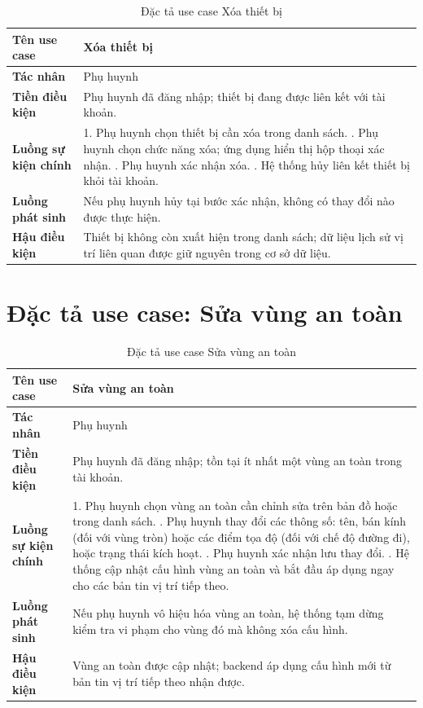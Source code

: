 \documentclass[../DoAn.tex]{subfiles}
\begin{document}
\begin{table}[H]
\centering
\caption{Đặc tả use case Xóa thiết bị}
\label{table:uc_delete_device}
\begin{tabular}{|l|p{9.5cm}|}
\hline
\textbf{Tên use case}       & Xóa thiết bị \\
\hline
\textbf{Tác nhân}           & Phụ huynh \\
\hline
\textbf{Tiền điều kiện}     & Phụ huynh đã đăng nhập; thiết bị đang được liên kết với tài khoản. \\
\hline
\textbf{Luồng sự kiện chính} &
1. Phụ huynh chọn thiết bị cần xóa trong danh sách. \newline
2. Phụ huynh chọn chức năng xóa; ứng dụng hiển thị hộp thoại xác nhận. \newline
3. Phụ huynh xác nhận xóa. \newline
4. Hệ thống hủy liên kết thiết bị khỏi tài khoản. \\
\hline
\textbf{Luồng phát sinh}    & Nếu phụ huynh hủy tại bước xác nhận, không có thay đổi nào được thực hiện. \\
\hline
\textbf{Hậu điều kiện}      & Thiết bị không còn xuất hiện trong danh sách; dữ liệu lịch sử vị trí liên quan được giữ nguyên trong cơ sở dữ liệu. \\
\hline
\end{tabular}
\end{table}

\section{Đặc tả use case: Sửa vùng an toàn}

\begin{table}[H]
\centering
\caption{Đặc tả use case Sửa vùng an toàn}
\label{table:uc_edit_geofence}
\begin{tabular}{|l|p{9.5cm}|}
\hline
\textbf{Tên use case}       & Sửa vùng an toàn \\
\hline
\textbf{Tác nhân}           & Phụ huynh \\
\hline
\textbf{Tiền điều kiện}     & Phụ huynh đã đăng nhập; tồn tại ít nhất một vùng an toàn trong tài khoản. \\
\hline
\textbf{Luồng sự kiện chính} &
1. Phụ huynh chọn vùng an toàn cần chỉnh sửa trên bản đồ hoặc trong danh sách. \newline
2. Phụ huynh thay đổi các thông số: tên, bán kính (đối với vùng tròn) hoặc các điểm tọa độ (đối với chế độ đường đi), hoặc trạng thái kích hoạt. \newline
3. Phụ huynh xác nhận lưu thay đổi. \newline
4. Hệ thống cập nhật cấu hình vùng an toàn và bắt đầu áp dụng ngay cho các bản tin vị trí tiếp theo. \\
\hline
\textbf{Luồng phát sinh}    & Nếu phụ huynh vô hiệu hóa vùng an toàn, hệ thống tạm dừng kiểm tra vi phạm cho vùng đó mà không xóa cấu hình. \\
\hline
\textbf{Hậu điều kiện}      & Vùng an toàn được cập nhật; backend áp dụng cấu hình mới từ bản tin vị trí tiếp theo nhận được. \\
\hline
\end{tabular}
\end{table}
\end{document}
